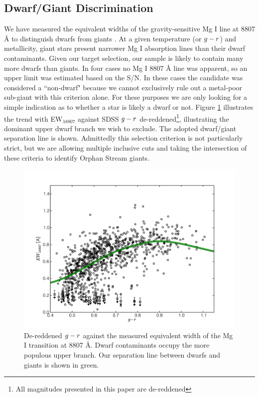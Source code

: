 \documentclass{emulateapj}
\begin{document}
\subsection{Dwarf/Giant Discrimination}
\label{sec:dwarf-giant}

We have measured the equivalent widths of the gravity-sensitive Mg I line at 8807 \AA{} to distinguish dwarfs from giants \citep{Battaglia;Starkenburg_2012}. At a given temperature (or $g \-- r$) and metallicity, giant stars present narrower Mg I absorption lines than their dwarf contaminants. Given our target selection, our sample is likely to contain many more dwarfs than giants. In four cases no Mg I 8807 \AA{} line was apparent, so an upper limit was estimated based on the S/N. In these cases the candidate was considered a ``non-dwarf" because we cannot exclusively rule out a metal-poor sub-giant with this criterion alone. For these purposes we are only looking for a simple indication as to whether a star is likely a dwarf or not. Figure \ref{fig:ew-mg} illustrates the trend with EW$_{\lambda8807}$ against SDSS $g \-- r$ de-reddened\footnote{All magnitudes presented in this paper are de-reddened}, illustrating the dominant upper dwarf branch we wish to exclude. The adopted dwarf/giant separation line is shown. Admittedly this selection criterion is not particularly strict, but we are allowing multiple inclusive cuts and taking the intersection of these criteria to identify Orphan Stream giants.

\begin{figure}[h]
	\includegraphics[width=\columnwidth]{./figures/ew-mg.pdf}
	\caption{De-reddened $g \-- r$ against the measured equivalent width of the Mg I transition at 8807 \AA{}. Dwarf contaminants occupy the more populous upper branch. Our separation line between dwarfs and giants is shown in green.}
	\label{fig:ew-mg}
\end{figure}
\end{document}
